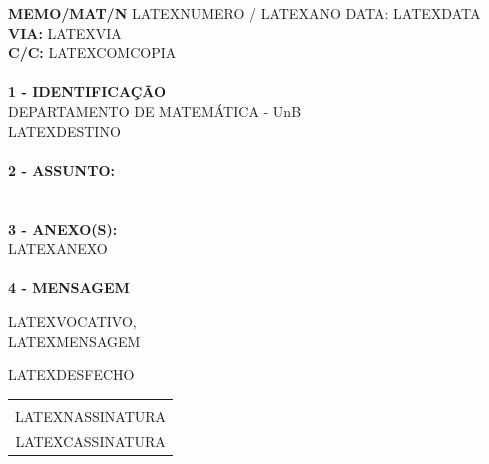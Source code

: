 \documentclass[12pt]{artigo_novo}
\begin{document}
\vspace*{.8cm}
\timbrado
\setlength{\baselineskip}{5mm}
\noindent 
\begin{minipage}{16cm}
\vspace*{-8mm}
\parindent=1.2cm
\setlength{\baselineskip}{5mm}
\vspace*{.2cm}
\noindent
\small
{\bf  MEMO/MAT/N\primo} LATEXNUMERO / LATEXANO \hfill {DATA:} {LATEXDATA}
\vum \\
{\bf VIA:} {LATEXVIA}  
\\
{\bf C/C:} {LATEXCOMCOPIA}  
\\
\mbox{} \hrulefill\
\\
{\bf 1 - IDENTIFICA\c{C}\~AO} 
\\
\phantom{xxx}{\bf Proced\^encia:} {DEPARTAMENTO DE MATEM\'ATICA - UnB}
\\
 {LATEXDESTINO}
\\
\mbox{} \hrulefill\
\\
{\bf 2 - ASSUNTO:} \\
\phantom{xxx}{LATEXASSUNTO}
\\
\mbox{} \hrulefill\
\\
{\bf 3 - ANEXO(S):} 
\\
\phantom{xxx} {LATEXANEXO}
\\
\mbox{} \hrulefill\
\\
{ \bf 4 - MENSAGEM} 
\end{minipage}
\setlength{\baselineskip}{5mm}
\vspace*{.92cm} 

LATEXVOCATIVO,
\vspace*{8mm} \\
\noindent 
LATEXMENSAGEM 
\vspace*{8mm} 
\hspace*{8cm} 
\setlength{\baselineskip}{5mm}
\vspace*{10mm} 

LATEXDESFECHO
\vspace*{15mm} \\
\begin{center} 
\begin{tabular}{c}
\hline \vspace*{-3mm}\\
LATEXNASSINATURA \\
{\small LATEXCASSINATURA}
%
\end{tabular} 
\end{center}
\end{document}
